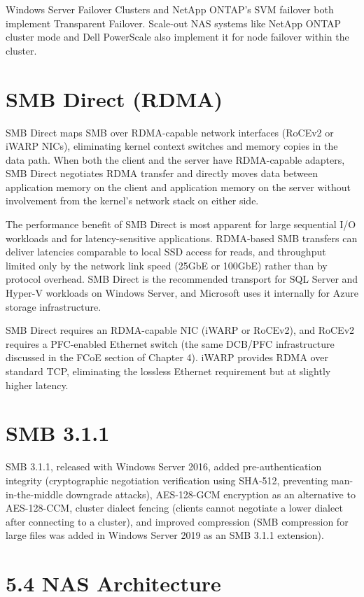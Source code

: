 Windows Server Failover Clusters and NetApp ONTAP's SVM failover both implement Transparent Failover. Scale-out NAS systems like NetApp ONTAP cluster mode and Dell PowerScale also implement it for node failover within the cluster.

\section{SMB Direct (RDMA)}
SMB Direct maps SMB over RDMA-capable network interfaces (RoCEv2 or iWARP NICs), eliminating kernel context switches and memory copies in the data path. When both the client and the server have RDMA-capable adapters, SMB Direct negotiates RDMA transfer and directly moves data between application memory on the client and application memory on the server without involvement from the kernel's network stack on either side.

The performance benefit of SMB Direct is most apparent for large sequential I/O workloads and for latency-sensitive applications. RDMA-based SMB transfers can deliver latencies comparable to local SSD access for reads, and throughput limited only by the network link speed (25GbE or 100GbE) rather than by protocol overhead. SMB Direct is the recommended transport for SQL Server and Hyper-V workloads on Windows Server, and Microsoft uses it internally for Azure storage infrastructure.

SMB Direct requires an RDMA-capable NIC (iWARP or RoCEv2), and RoCEv2 requires a PFC-enabled Ethernet switch (the same DCB/PFC infrastructure discussed in the FCoE section of Chapter 4). iWARP provides RDMA over standard TCP, eliminating the lossless Ethernet requirement but at slightly higher latency.

\section{SMB 3.1.1}
SMB 3.1.1, released with Windows Server 2016, added pre-authentication integrity (cryptographic negotiation verification using SHA-512, preventing man-in-the-middle downgrade attacks), AES-128-GCM encryption as an alternative to AES-128-CCM, cluster dialect fencing (clients cannot negotiate a lower dialect after connecting to a cluster), and improved compression (SMB compression for large files was added in Windows Server 2019 as an SMB 3.1.1 extension).

\section{5.4 NAS Architecture}
